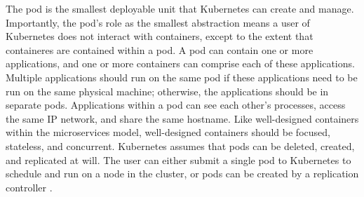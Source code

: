 The pod is the smallest deployable unit that Kubernetes can create and
manage. Importantly, the pod's role as the smallest abstraction means a user of
Kubernetes does not interact with containers, except to the extent that
containeres are contained within a pod. A pod can contain one or more
applications, and one or more containers can comprise each of these applications.
Multiple applications should run on the same pod
if these applications need to be run on the same
physical machine; otherwise, the applications should be in separate pods.
Applications within a pod can see each other's processes,
access the same IP network, and share the same hostname. Like well-designed
containers within the microservices model, well-designed containers should be
focused, stateless, and concurrent. Kubernetes assumes that pods can be deleted,
created, and replicated at will. The user can either submit a
single pod to Kubernetes to schedule and run on a node in the cluster, or pods
can be created by a replication controller \cite{k8s-pods}.
